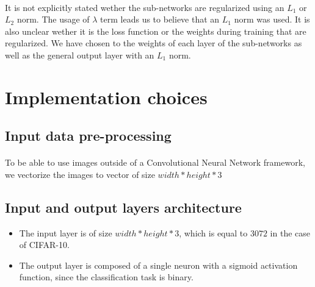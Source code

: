 \documentclass[11 pt]{article}
\begin{document}
\paragraph{} It is not explicitly stated wether the sub-networks are regularized using an \(L_1\) or \(L_2\) norm. The usage of \(\lambda\) term leads us to believe that an \(L_1\) norm was used. It is also unclear wether it is the loss function or the weights during training that are regularized. We have chosen to the weights of each layer of the sub-networks as well as the general output layer with an \(L_1\) norm.

\section{Implementation choices}
\subsection{Input data pre-processing}
\paragraph{}To be able to use images outside of a Convolutional Neural Network framework, we vectorize the images to vector of size \(width*height*3\)

\subsection{Input and output layers architecture}
\begin{itemize}
	\item The input layer is of size \(width*height*3\), which is equal to \(3072\) in the case of CIFAR-10.
	\item  The output layer is composed of a single neuron with a sigmoid activation function, since the classification task is binary.
\end{itemize}
\end{document}
